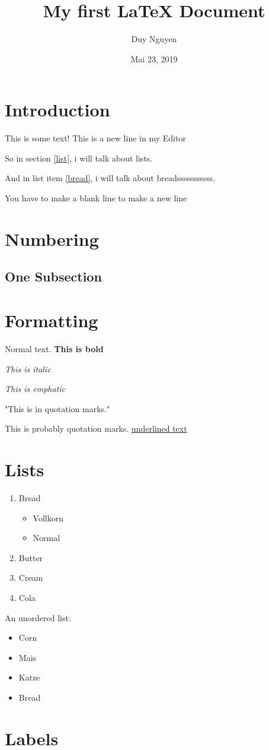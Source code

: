 \documentclass{article}
\author{Duy Nguyen}
\title{My first {\LaTeX} Document}
\date{Mai 23, 2019}
\begin{document}
\maketitle

\section{Introduction}

This is some text!
This is a new line in my Editor

So in section \ref{list}, i will talk about lists.

And in list item \ref{bread}, i will talk about breadsssssssssss.

You have to make a blank line to make a new line

\section{Numbering}

\subsection{One Subsection}

\section{Formatting}
Normal text. \textbf{This is bold}

\textit{This is italic}

\emph{This is emphatic}


"This is in quotation marks."

This is probably quotation marks.
\underline{underlined text}

\section{Lists\label{list}}

\begin{enumerate}
	\item Bread\label{bread}
		\begin{itemize}
			\item Vollkorn
			\item Normal
		\end{itemize}
	\item Butter
	\item Cream
	\item Cola

\end{enumerate}
An unordered list:
\begin{itemize}
	\item Corn
	\item Mais
	\item Katze
	\item Bread
\end{itemize}

\section{Labels}
\end{document}
